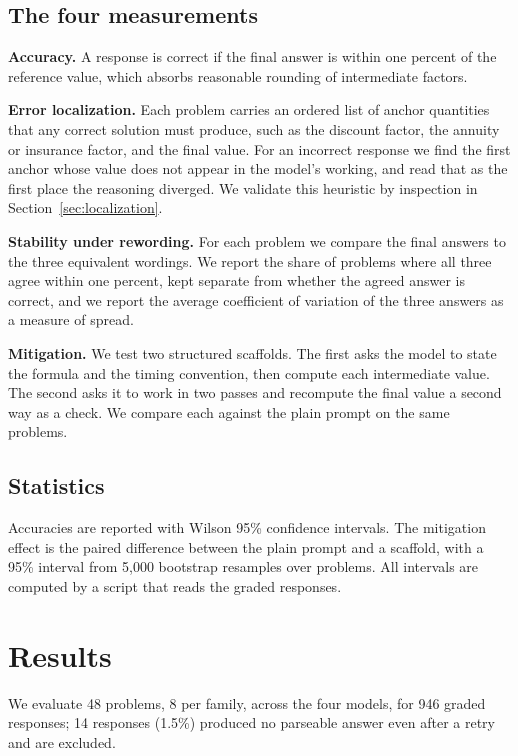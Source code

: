 \documentclass{article}
\begin{document}
\subsection{The four measurements}
\textbf{Accuracy.} A response is correct if the final answer is within one percent of the reference value, which absorbs reasonable rounding of intermediate factors.

\textbf{Error localization.} Each problem carries an ordered list of anchor quantities that any correct solution must produce, such as the discount factor, the annuity or insurance factor, and the final value. For an incorrect response we find the first anchor whose value does not appear in the model's working, and read that as the first place the reasoning diverged. We validate this heuristic by inspection in Section~\ref{sec:localization}.

\textbf{Stability under rewording.}\label{sec:consistency} For each problem we compare the final answers to the three equivalent wordings. We report the share of problems where all three agree within one percent, kept separate from whether the agreed answer is correct, and we report the average coefficient of variation of the three answers as a measure of spread.

\textbf{Mitigation.} We test two structured scaffolds. The first asks the model to state the formula and the timing convention, then compute each intermediate value. The second asks it to work in two passes and recompute the final value a second way as a check. We compare each against the plain prompt on the same problems.

\subsection{Statistics}
Accuracies are reported with Wilson 95\% confidence intervals. The mitigation effect is the paired difference between the plain prompt and a scaffold, with a 95\% interval from 5{,}000 bootstrap resamples over problems. All intervals are computed by a script that reads the graded responses.

\section{Results}
We evaluate 48 problems, 8 per family, across the four models, for 946 graded responses; 14 responses (1.5\%) produced no parseable answer even after a retry and are excluded.
\end{document}
